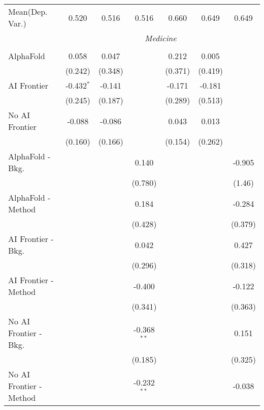 \begin{tabular}{lcccccc}
Mean(Dep. Var.) & 0.520 & 0.516 & 0.516 & 0.660 & 0.649 & 0.649 \\
 & \multicolumn{6}{c}{\textit{Medicine}} \\ \\
   AlphaFold               & 0.058        & 0.047   &               & 0.212   & 0.005   &   \\   
                           & (0.242)      & (0.348) &               & (0.371) & (0.419) &   \\   
   AI Frontier             & -0.432$^{*}$ & -0.141  &               & -0.171  & -0.181  &   \\   
                           & (0.245)      & (0.187) &               & (0.289) & (0.513) &   \\   
   No AI Frontier          & -0.088       & -0.086  &               & 0.043   & 0.013   &   \\   
                           & (0.160)      & (0.166) &               & (0.154) & (0.262) &   \\   
   AlphaFold - Bkg.        &              &         & 0.140         &         &         & -0.905\\   
                           &              &         & (0.780)       &         &         & (1.46)\\   
   AlphaFold - Method      &              &         & 0.184         &         &         & -0.284\\   
                           &              &         & (0.428)       &         &         & (0.379)\\   
   AI Frontier - Bkg.      &              &         & 0.042         &         &         & 0.427\\   
                           &              &         & (0.296)       &         &         & (0.318)\\   
   AI Frontier - Method    &              &         & -0.400        &         &         & -0.122\\   
                           &              &         & (0.341)       &         &         & (0.363)\\   
   No AI Frontier - Bkg.   &              &         & -0.368$^{**}$ &         &         & 0.151\\   
                           &              &         & (0.185)       &         &         & (0.325)\\   
   No AI Frontier - Method &              &         & -0.232$^{**}$ &         &         & -0.038\\   

\end{tabular}
